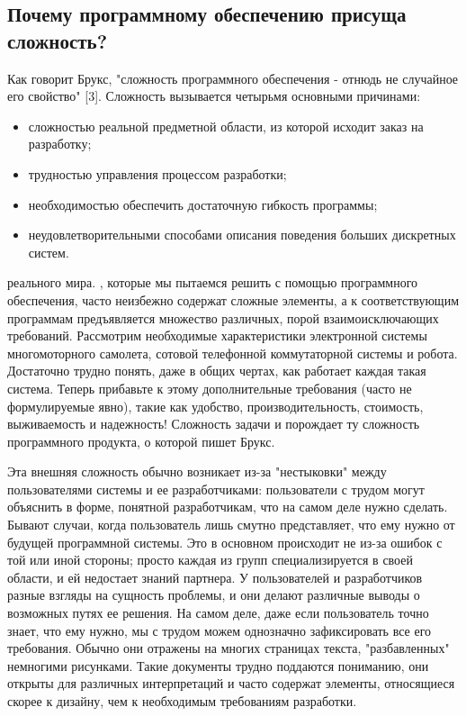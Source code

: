 \documentclass[11pt]{article}
\begin{document}
\subsection{Почему программному обеспечению присуща сложность? }
Как говорит Брукс, "сложность программного обеспечения - отнюдь не случайное его свойство" [3]. Сложность вызывается четырьмя основными причинами: 
\begin{itemize}
\item сложностью реальной предметной области, из которой исходит заказ на разработку;
\item трудностью управления процессом разработки;
\item необходимостью обеспечить достаточную гибкость программы;
\item неудовлетворительными способами описания поведения больших дискретных систем.
\end{itemize} \bigskip

 реального мира. , которые мы пытаемся решить с помощью программного обеспечения, часто неизбежно содержат сложные элементы, а к соответствующим программам предъявляется множество различных, порой взаимоисключающих требований. Рассмотрим необходимые характеристики электронной системы многомоторного самолета, сотовой телефонной коммутаторной системы и робота. Достаточно трудно понять, даже в общих чертах, как работает каждая такая система. Теперь прибавьте к этому дополнительные требования (часто не формулируемые явно), такие как удобство, производительность, стоимость, выживаемость и надежность! Сложность задачи и порождает ту сложность программного продукта, о которой пишет Брукс. \bigskip

Эта внешняя сложность обычно возникает из-за "нестыковки" между пользователями системы и ее разработчиками: пользователи с трудом могут объяснить в форме, понятной разработчикам, что на самом деле нужно сделать. Бывают случаи, когда пользователь лишь смутно представляет, что ему нужно от будущей программной системы. Это в основном происходит не из-за ошибок с той или иной стороны; просто каждая из групп специализируется в своей области, и ей недостает знаний партнера. У пользователей и разработчиков разные взгляды на сущность проблемы, и они делают различные выводы о возможных путях ее решения. На самом деле, даже если пользователь точно знает, что ему нужно, мы с трудом можем однозначно зафиксировать все его требования. Обычно они отражены на многих страницах текста, "разбавленных" немногими рисунками. Такие документы трудно поддаются пониманию, они открыты для различных интерпретаций и часто содержат элементы, относящиеся скорее к дизайну, чем к необходимым требованиям разработки. \bigskip
\end{document}
